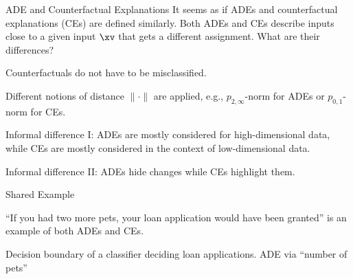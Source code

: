\documentclass[10pt,compress,t,notes=noshow, xcolor=table]{beamer}
\begin{document}
\newcommand{\vertiii}[1]{{\left\vert\kern-0.25ex\left\vert\kern-0.25ex\left\vert #1 \right\vert\kern-0.25ex\right\vert\kern-0.25ex\right\vert}}






\begin{framev}[align=top]{ADE and Counterfactual Explanations}
It seems as if ADEs and counterfactual explanations (CEs) are defined similarly.
Both ADEs and CEs describe inputs close to a given input $\xv$ that gets a different assignment.
What are their differences?
\begin{itemizeM}
\item Counterfactuals do not have to be misclassified.
\item Different notions of distance $\|\cdot\|$ are applied, e.g., $p_{2,\infty}$-norm for ADEs or $p_{0,1}$-norm for CEs.
\item Informal difference I: ADEs are mostly considered for high-dimensional data, while CEs are mostly considered in the context of low-dimensional data.
\item Informal difference II: ADEs hide changes while CEs highlight them.
\end{itemizeM}
\end{framev}


\begin{framev}[align=top]{Shared Example }
\begin{itemizeM}
\item ``If you had two more pets, your loan application would have been granted'' is an example of both ADEs and CEs.
\end{itemizeM}
{\centering Decision boundary of a classifier deciding loan applications. ADE via ``number of pets''\par}
\end{framev}

\endlecture
\end{document}
